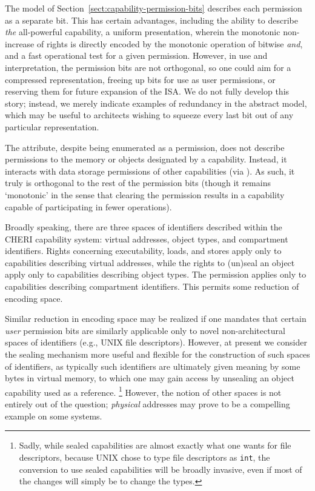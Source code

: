The model of Section~\ref{sect:capability-permission-bits} describes each
permission as a separate bit.  This has certain advantages, including the
ability to describe {\em the} all-powerful capability, a uniform
presentation, wherein the monotonic non-increase of rights is directly
encoded by the monotonic operation of bitwise \emph{and}, and a fast operational
test for a given permission.  However, in use and interpretation, the
permission bits are not orthogonal, so one could aim for a compressed
representation, freeing up bits for use as user permissions, or reserving
them for future expansion of the ISA.  We do not fully develop this story;
instead, we merely indicate examples of redundancy in the abstract model,
which may be useful to architects wishing to squeeze every last bit out of
any particular representation.

The \cappermG attribute, despite being enumerated as a permission, does not
describe permissions to the memory or objects designated by a capability.
Instead, it interacts with data storage permissions of other capabilities
(via \cappermSLC).  As such, it truly is orthogonal to
the rest of the permission bits (though it remains `monotonic' in the
sense that clearing the \cappermG permission results in a capability capable of
participating in fewer operations).

Broadly speaking, there are three spaces of identifiers described within the
CHERI capability system: virtual addresses, object types, and compartment
identifiers.  Rights concerning executability, loads, and stores apply only
to capabilities describing virtual addresses, while the rights to (un)seal
an object apply only to capabilities describing object types.  The
\cappermCid permission applies only to capabilities describing
compartment identifiers.  This permits some reduction of encoding space.

Similar reduction in encoding space may be realized if one mandates that
certain {\em user} permission bits are similarly applicable only to novel
non-architectural spaces of identifiers (e.g., UNIX file descriptors).
However, at
present we consider the sealing mechanism more useful and flexible
for the construction of such spaces of identifiers, as typically such
identifiers are ultimately given meaning by some bytes in virtual memory, to
which one may gain access by unsealing an object capability used as a
reference.%
%
\footnote{Sadly, while sealed capabilities are almost exactly what one wants
for file descriptors, because UNIX chose to type file descriptors as
\texttt{int}, the conversion to use sealed capabilities will be broadly
invasive, even if most of the changes will simply be to change the types.}
%
However, the notion of other spaces is not entirely out of the question; {\em
physical} addresses may prove to be a compelling example on some systems.

